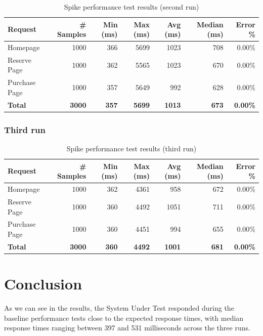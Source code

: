 \documentclass[11pt, leqno, oneside]{article}
\begin{document}
\begin{table}[H]
\centering
\small
\begin{tabularx}{\textwidth}{X r r r r r r}
  \hline
  \textbf{Request} & \textbf{\# Samples} & \textbf{Min (ms)} & \textbf{Max (ms)} & \textbf{Avg (ms)} & \textbf{Median (ms)} & \textbf{Error \%} \\
  \hline
  Homepage      & 1000 & 366 & 5699 & 1023 & 708 & 0.00\% \\
  Reserve Page  & 1000 & 362 & 5565 & 1023 & 670 & 0.00\% \\
  Purchase Page & 1000 & 357 & 5649 &  992 & 628 & 0.00\% \\
  \hline
  \textbf{Total} & \textbf{3000} & \textbf{357} & \textbf{5699} & \textbf{1013} & \textbf{673} & \textbf{0.00\%} \\
  \hline
\end{tabularx}
\caption{Spike performance test results (second run)}
\label{tab:spike2}
\end{table}

\subsubsection{Third run}

\begin{table}[H]
\centering
\small
\begin{tabularx}{\textwidth}{X r r r r r r}
  \hline
  \textbf{Request} & \textbf{\# Samples} & \textbf{Min (ms)} & \textbf{Max (ms)} & \textbf{Avg (ms)} & \textbf{Median (ms)} & \textbf{Error \%} \\
  \hline
  Homepage      & 1000 & 362 & 4361 &  958 & 672 & 0.00\% \\
  Reserve Page  & 1000 & 360 & 4492 & 1051 & 711 & 0.00\% \\
  Purchase Page & 1000 & 360 & 4451 &  994 & 655 & 0.00\% \\
  \hline
  \textbf{Total} & \textbf{3000} & \textbf{360} & \textbf{4492} & \textbf{1001} & \textbf{681} & \textbf{0.00\%} \\
  \hline
\end{tabularx}
\caption{Spike performance test results (third run)}
\label{tab:spike3}
\end{table}

\section{Conclusion}
As we can see in the results, the System Under Test responded during the baseline  performance tests close to the expected response times, with median response times 
ranging between 397 and 531 milliseconds across the three runs.
\end{document}
